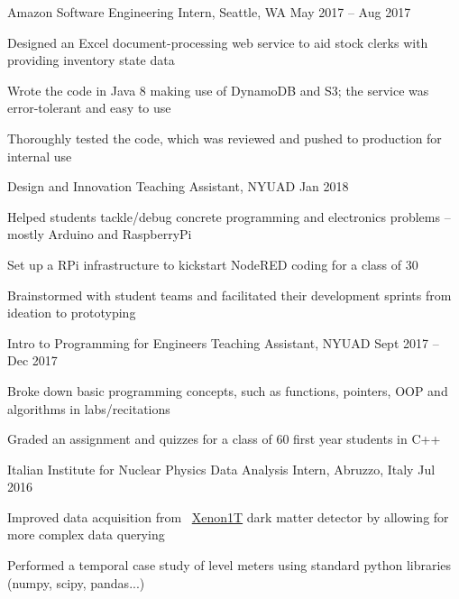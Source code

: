 


\begin{cventries}
  \projectwithsubtitle
    {Amazon }
    {Software Engineering Intern, Seattle, WA} 
    {May 2017 -- Aug 2017}
    {
        \begin{cvitems}
          \item{Designed an Excel document-processing web service to aid stock clerks with providing inventory state data}
          \item{Wrote the code in Java 8 making use of DynamoDB and S3; the service was error-tolerant and easy to use}
          \item {Thoroughly tested the code, which was reviewed and pushed to production for internal use}
        \end{cvitems}
    }

  \projectwithsubtitle
    {Design and Innovation } 
    {Teaching Assistant, NYUAD} %
    {Jan 2018} %
    {
      \begin{cvitems} %
        \item {Helped students tackle/debug concrete programming and electronics problems -- mostly Arduino and RaspberryPi}
        \item {Set up a RPi infrastructure to kickstart NodeRED coding for a class of 30 }
        \item {Brainstormed with student teams and facilitated their development sprints from ideation to prototyping}
      \end{cvitems}
    }

  \projectwithsubtitle
    {Intro to Programming for Engineers }
    {Teaching Assistant, NYUAD} %
    {Sept 2017 -- Dec 2017} %
    {
      \begin{cvitems} %
        \item {Broke down basic programming concepts, such as functions, pointers, OOP and algorithms in labs/recitations} 
        \item {Graded an assignment and quizzes for a class of 60 first year students in C++}
      \end{cvitems}
    }

  \projectwithsubtitle
    {Italian Institute for Nuclear Physics }
    {Data Analysis Intern, Abruzzo, Italy} %
    {Jul 2016} %
    {
      \begin{cvitems} %
        \item{Improved data acquisition from \ \href{http://www.xenon1t.org/}{Xenon1T} dark matter detector by allowing for more complex data querying}
        \item{Performed a temporal case study of level meters using standard python libraries (numpy, scipy, pandas...)}
      \end{cvitems}
    }
\end{cventries}


